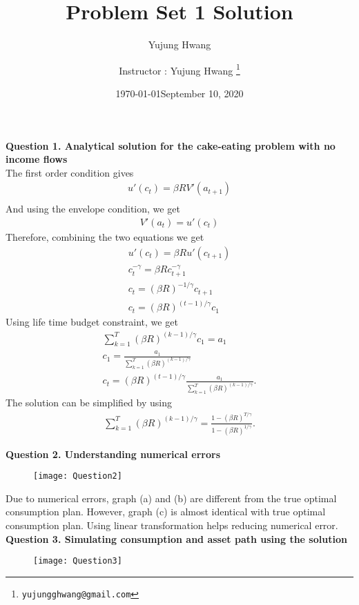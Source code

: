\documentclass[paper=a4, fontsize=13pt]{extarticle} %
\author{Yujung Hwang} %
\date{\today} %
\numberwithin{equation}{section} %
\numberwithin{figure}{section} %
\numberwithin{table}{section} %
\begin{document}
\title{	
\normalfont \normalsize 
\huge Problem Set 1 Solution
}
\author{
Instructor : Yujung Hwang \thanks{\texttt{yujungghwang@gmail.com}}} %
\date{September 10, 2020} %
\maketitle %

\upshape \mdseries 

\normalsize
\textbf{Question 1. Analytical solution for the cake-eating problem with no income flows} \\
The first order condition gives
\begin{eqnarray}
u'(c_t) = \beta R V'(a_{t+1}) \\
\end{eqnarray}
And using the envelope condition, we get
\begin{gather}
V'(a_t) = u'(c_t)
\end{gather}
Therefore, combining the two equations we get
\begin{gather}
u'(c_t) = \beta R u'(c_{t+1}) \\
c_t^{-\gamma} = \beta R c_{t+1}^{-\gamma} \\
c_t = (\beta R)^{-1/\gamma} c_{t+1} \\
c_t = (\beta R)^{(t-1)/\gamma} c_1
\end{gather}
Using life time budget constraint, we get
\begin{gather}
\sum_{k=1}^{T} (\beta R)^{(k-1)/\gamma} c_1 = a_1 \\
c_1 = \frac{a_1}{\sum_{k=1}^{T} (\beta R)^{(k-1)/\gamma} } \\
c_t = (\beta R)^{(t-1)/\gamma} \frac{a_1}{\sum_{k=1}^{T} (\beta R)^{(k-1)/\gamma} }.
\end{gather}
The solution can be simplified by using
\begin{gather}
\sum_{k=1}^{T} (\beta R)^{(k-1)/\gamma} = \frac{ 1 - (\beta R)^{T/\gamma} }{1 - (\beta R)^{1/\gamma} }.
\end{gather}

\textbf{Question 2. Understanding numerical errors} \\
\begin{figure}[H]
\centering
\texttt{[image: Question2]}
\label{fig:question2}
\end{figure}
Due to numerical errors, graph (a) and (b) are different from the true optimal consumption plan. However, graph (c) is almost identical with true optimal consumption plan. Using linear transformation helps reducing numerical error.\\

\textbf{Question 3. Simulating consumption and asset path using the solution} \\
\begin{figure}[H]
\centering
\texttt{[image: Question3]}
\label{fig:question3}
\end{figure}
\end{document}
